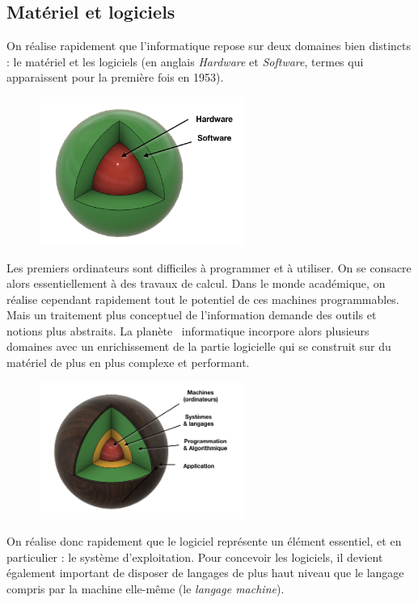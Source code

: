 \documentclass[a4paper,11pt]{book}
\begin{document}
\subsection{Matériel et logiciels}
On réalise rapidement que l'informatique repose sur deux domaines bien distincts : le matériel et les logiciels (en anglais \textit{Hardware} et \textit{Software}, termes qui apparaissent pour la première fois en 1953).
\begin{figure}[h]
    \centering
    \includegraphics[width=0.6\textwidth]{media/infographies/planete_HS.png}
\end{figure}
Les premiers ordinateurs sont difficiles à programmer et à utiliser. On se consacre alors essentiellement à des travaux de calcul. Dans le monde académique, on réalise cependant rapidement tout le potentiel de ces machines programmables. Mais un traitement plus conceptuel de l'information demande des outils et notions plus abstraits. La \guillemotleft planète\guillemotright~ informatique incorpore alors  plusieurs domaines avec un enrichissement de la partie logicielle qui se construit sur du matériel de plus en plus complexe et performant.

\begin{figure}[h]
    \centering
    \includegraphics[width=0.6\textwidth]{media/infographies/planeteInfo.png}
\end{figure}

On réalise donc rapidement que le logiciel représente un élément essentiel, et en particulier : le système d'exploitation. Pour concevoir les logiciels, il devient également important de disposer de langages de plus haut niveau que le langage compris par la machine elle-même (le \textit{langage machine}).
\end{document}
